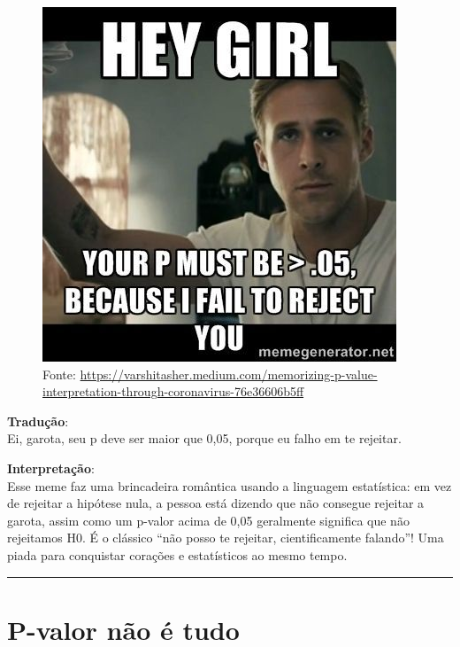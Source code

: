 \documentclass[
]{book}
\begin{document}
\begin{figure}
\centering
\includegraphics{p-value5.jpg}
\caption{Fonte: \url{https://varshitasher.medium.com/memorizing-p-value-interpretation-through-coronavirus-76e36606b5ff}}
\end{figure}

\textbf{Tradução}:\\
Ei, garota, seu p deve ser maior que 0,05, porque eu falho em te rejeitar.

\textbf{Interpretação}:\\
Esse meme faz uma brincadeira romântica usando a linguagem estatística: em vez de rejeitar a hipótese nula, a pessoa está dizendo que não consegue rejeitar a garota, assim como um p-valor acima de 0,05 geralmente significa que não rejeitamos H0. É o clássico ``não posso te rejeitar, cientificamente falando''! Uma piada para conquistar corações e estatísticos ao mesmo tempo.

\begin{center}\rule{0.5\linewidth}{0.5pt}\end{center}

\section{P-valor não é tudo}\label{p-valor-nuxe3o-uxe9-tudo}
\end{document}
